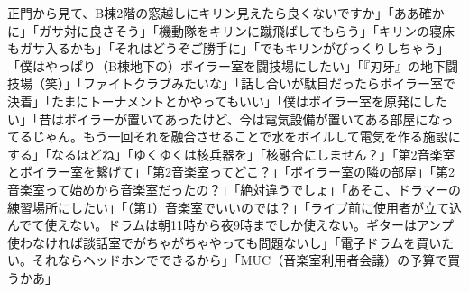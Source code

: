 正門から見て、B棟2階の窓越しにキリン見えたら良くないですか」「ああ確かに」「ガサ対に良さそう」「機動隊をキリンに蹴飛ばしてもらう」「キリンの寝床もガサ入るかも」「それはどうぞご勝手に」「でもキリンがびっくりしちゃう」「僕はやっぱり（B棟地下の）ボイラー室を闘技場にしたい」「『刃牙』の地下闘技場（笑）」「ファイトクラブみたいな」「話し合いが駄目だったらボイラー室で決着」「たまにトーナメントとかやってもいい」「僕はボイラー室を原発にしたい」「昔はボイラーが置いてあったけど、今は電気設備が置いてある部屋になってるじゃん。もう一回それを融合させることで水をボイルして電気を作る施設にする」「なるほどね」「ゆくゆくは核兵器を」「核融合にしません？」「第2音楽室とボイラー室を繋げて」「第2音楽室ってどこ？」「ボイラー室の隣の部屋」「第2音楽室って始めから音楽室だったの？」「絶対違うでしょ」「あそこ、ドラマーの練習場所にしたい」「（第1）音楽室でいいのでは？」「ライブ前に使用者が立て込んでて使えない。ドラムは朝11時から夜9時までしか使えない。ギターはアンプ使わなければ談話室でがちゃがちゃやっても問題ないし」「電子ドラムを買いたい。それならヘッドホンでできるから」「MUC（音楽室利用者会議）の予算で買うかあ」

